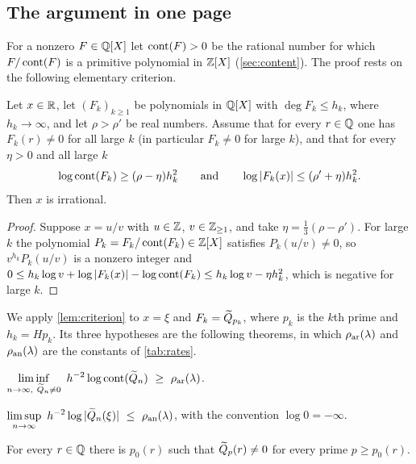 \subsection{The argument in one page}\label{sec:one-page}
For a nonzero $F\in\mathbb{Q}[X]$ let $\operatorname{cont}(F)>0$ be the rational number for which $F/\operatorname{cont}(F)$ is a primitive polynomial in $\mathbb{Z}[X]$ (\cref{sec:content}). The proof rests on the following elementary criterion.

\begin{lemma}\label{lem:criterion}
Let $x\in\mathbb{R}$, let $(F_k)_{k\ge1}$ be polynomials in $\mathbb{Q}[X]$ with $\deg F_k\le h_k$, where $h_k\to\infty$, and let $\rho>\rho'$ be real numbers. Assume that for every $r\in\mathbb{Q}$ one has $F_k(r)\ne0$ for all large $k$ (in particular $F_k\ne0$ for large $k$), and that for every $\eta>0$ and all large $k$
\[
\log\operatorname{cont}(F_k)\ge(\rho-\eta)h_k^2\qquad\text{and}\qquad\log|F_k(x)|\le(\rho'+\eta)h_k^2 .
\]
Then $x$ is irrational.
\end{lemma}

\begin{proof}
Suppose $x=u/v$ with $u\in\mathbb{Z}$, $v\in\mathbb{Z}_{\ge1}$, and take $\eta=\frac13(\rho-\rho')$. For large $k$ the polynomial $P_k=F_k/\operatorname{cont}(F_k)\in\mathbb{Z}[X]$ satisfies $P_k(u/v)\ne0$, so $v^{h_k}P_k(u/v)$ is a nonzero integer and $0\le h_k\log v+\log|F_k(x)|-\log\operatorname{cont}(F_k)\le h_k\log v-\eta h_k^2$, which is negative for large $k$.
\end{proof}

We apply \cref{lem:criterion} to $x=\xi$ and $F_k=\widetilde{Q}_{p_k}$, where $p_k$ is the $k$th prime and $h_k=Hp_k$. Its three hypotheses are the following theorems, in which $\rho_{\mathrm{ar}}(\lambda)$ and $\rho_{\mathrm{an}}(\lambda)$ are the constants of \cref{tab:rates}.

\begin{theorem}\label{thm:arith}
$\displaystyle\liminf_{n\to\infty,\ \Qt_n\ne0}\ h^{-2}\log\cont(\Qt_n)\ \ge\ \rar(\lambda)$.
\end{theorem}

\begin{theorem}\label{thm:arch}
$\displaystyle\limsup_{n\to\infty}\ h^{-2}\log|\Qt_n(\xi)|\ \le\ \ran(\lambda)$, with the convention $\log0=-\infty$.
\end{theorem}

\begin{theorem}\label{thm:nonvanishing}
For every $r\in\mathbb{Q}$ there is $p_0(r)$ such that $\widetilde{Q}_p(r)\ne0$ for every prime $p\ge p_0(r)$.
\end{theorem}

